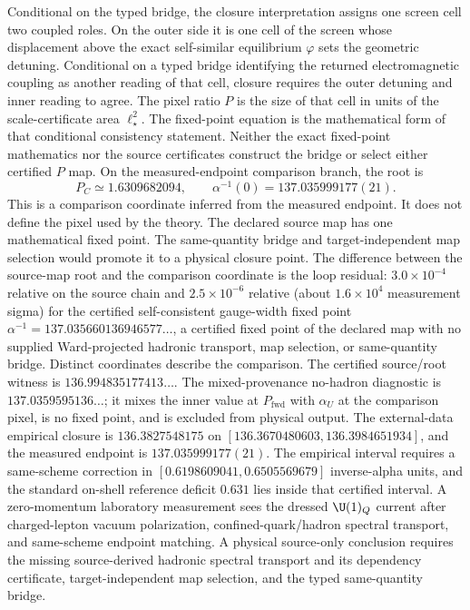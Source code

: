 Conditional on the typed bridge, the closure interpretation assigns one screen cell two coupled roles. On the outer side it is one
cell of the screen whose displacement above the exact self-similar equilibrium \(\varphi\) sets
the geometric detuning. Conditional on a typed bridge identifying the returned
electromagnetic coupling as another reading of that cell, closure requires the
outer detuning and inner reading to agree. The pixel ratio \(P\) is the size of that cell
in units of the scale-certificate area \(\ell_\star^2\). The fixed-point equation is the mathematical form of that
conditional consistency statement. Neither the exact fixed-point mathematics
nor the source certificates construct the bridge or select either certified
\(P\) map. On the measured-endpoint comparison branch, the root is
\[
P_C\simeq1.6309682094,\qquad
\alpha^{-1}(0)=137.035999177(21).
\]
This is a comparison coordinate inferred from the measured endpoint. It does
not define the pixel used by the theory. The declared source map has one
mathematical fixed point. The same-quantity bridge and target-independent map
selection would promote it to a physical closure point. The difference between
the source-map root and the comparison coordinate is the loop residual:
\(3.0\times10^{-4}\) relative on the source chain and
\(2.5\times10^{-6}\) relative (about \(1.6\times10^{4}\) measurement sigma)
for the certified self-consistent gauge-width fixed point
\(\alpha^{-1}=137.035660136946577\ldots\), a certified fixed point of the declared map
with no supplied Ward-projected hadronic transport, map selection, or
same-quantity bridge. Distinct coordinates describe the
comparison. The certified source/root witness is \(136.994835177413\ldots\).
The mixed-provenance no-hadron
diagnostic is \(137.0359595136\ldots\); it mixes the inner value at \(P_{\mathrm{fwd}}\) with
\(\alpha_U\) at the comparison pixel, is no fixed point, and is excluded from physical output. The
external-data empirical closure is
\(136.3827548175\) on \([136.3670480603,136.3984651934]\), and the measured endpoint is
\(137.035999177(21)\). The empirical interval requires a same-scheme correction in
\([0.6198609041,0.6505569679]\) inverse-alpha units, and the standard on-shell reference
deficit \(0.631\) lies inside that certified interval. A zero-momentum laboratory measurement sees
the dressed \(\U(1)_Q\) current after charged-lepton vacuum polarization, confined-quark/hadron
spectral transport, and same-scheme endpoint matching. A physical source-only
conclusion requires the missing source-derived hadronic spectral transport and
its dependency certificate, target-independent map selection, and the typed
same-quantity bridge.

